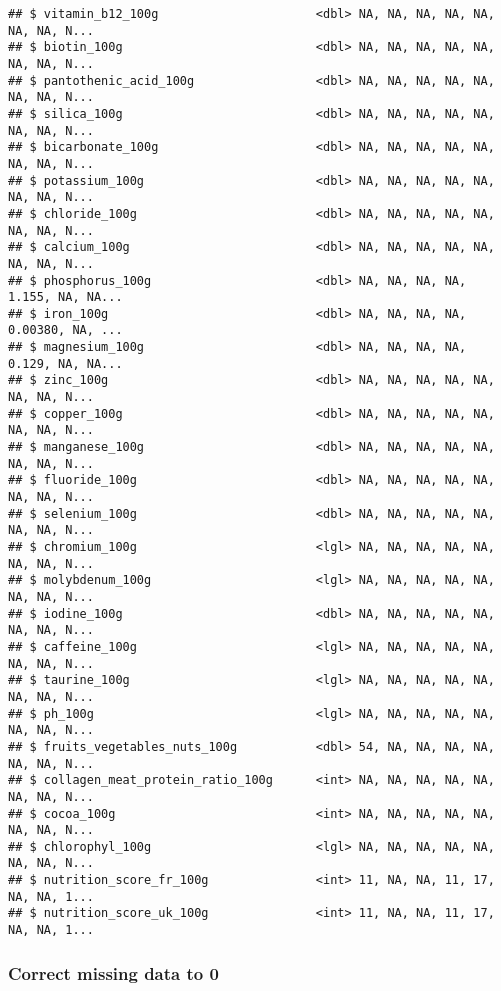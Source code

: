 \documentclass[]{article}
\begin{document}
\begin{verbatim}
## $ vitamin_b12_100g                      <dbl> NA, NA, NA, NA, NA, NA, NA, N...
## $ biotin_100g                           <dbl> NA, NA, NA, NA, NA, NA, NA, N...
## $ pantothenic_acid_100g                 <dbl> NA, NA, NA, NA, NA, NA, NA, N...
## $ silica_100g                           <dbl> NA, NA, NA, NA, NA, NA, NA, N...
## $ bicarbonate_100g                      <dbl> NA, NA, NA, NA, NA, NA, NA, N...
## $ potassium_100g                        <dbl> NA, NA, NA, NA, NA, NA, NA, N...
## $ chloride_100g                         <dbl> NA, NA, NA, NA, NA, NA, NA, N...
## $ calcium_100g                          <dbl> NA, NA, NA, NA, NA, NA, NA, N...
## $ phosphorus_100g                       <dbl> NA, NA, NA, NA, 1.155, NA, NA...
## $ iron_100g                             <dbl> NA, NA, NA, NA, 0.00380, NA, ...
## $ magnesium_100g                        <dbl> NA, NA, NA, NA, 0.129, NA, NA...
## $ zinc_100g                             <dbl> NA, NA, NA, NA, NA, NA, NA, N...
## $ copper_100g                           <dbl> NA, NA, NA, NA, NA, NA, NA, N...
## $ manganese_100g                        <dbl> NA, NA, NA, NA, NA, NA, NA, N...
## $ fluoride_100g                         <dbl> NA, NA, NA, NA, NA, NA, NA, N...
## $ selenium_100g                         <dbl> NA, NA, NA, NA, NA, NA, NA, N...
## $ chromium_100g                         <lgl> NA, NA, NA, NA, NA, NA, NA, N...
## $ molybdenum_100g                       <lgl> NA, NA, NA, NA, NA, NA, NA, N...
## $ iodine_100g                           <dbl> NA, NA, NA, NA, NA, NA, NA, N...
## $ caffeine_100g                         <lgl> NA, NA, NA, NA, NA, NA, NA, N...
## $ taurine_100g                          <lgl> NA, NA, NA, NA, NA, NA, NA, N...
## $ ph_100g                               <lgl> NA, NA, NA, NA, NA, NA, NA, N...
## $ fruits_vegetables_nuts_100g           <dbl> 54, NA, NA, NA, NA, NA, NA, N...
## $ collagen_meat_protein_ratio_100g      <int> NA, NA, NA, NA, NA, NA, NA, N...
## $ cocoa_100g                            <int> NA, NA, NA, NA, NA, NA, NA, N...
## $ chlorophyl_100g                       <lgl> NA, NA, NA, NA, NA, NA, NA, N...
## $ nutrition_score_fr_100g               <int> 11, NA, NA, 11, 17, NA, NA, 1...
## $ nutrition_score_uk_100g               <int> 11, NA, NA, 11, 17, NA, NA, 1...
\end{verbatim}

\hypertarget{correct-missing-data-to-0}{%
\subsubsection{Correct missing data to
0}\label{correct-missing-data-to-0}}
\end{document}
